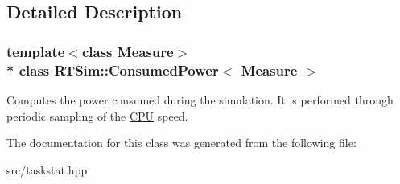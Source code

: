 \subsection{Detailed Description}
\subsubsection*{template$<$class Measure$>$\\*
class R\+T\+Sim\+::\+Consumed\+Power$<$ Measure $>$}

Computes the power consumed during the simulation. It is performed through periodic sampling of the \hyperlink{classRTSim_1_1CPU}{C\+PU} speed. 

The documentation for this class was generated from the following file\+:\begin{DoxyCompactItemize}
\item 
src/taskstat.\+hpp\end{DoxyCompactItemize}
